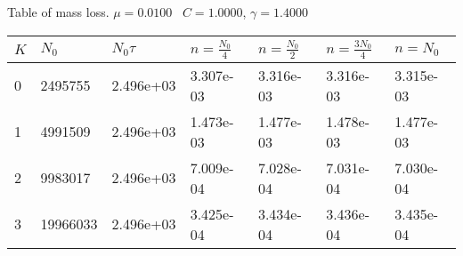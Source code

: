 \begin{center}
Table of mass loss. $\mu = 0.0100$ \, $C = 1.0000$, $\gamma = 1.4000$
  
\begin{tabular}{|p{0.8in}|p{0.8in}|p{0.8in}|p{0.8in}|p{0.8in}|p{0.8in}|p{0.8in}|} \hline
$K$ &$N_0$ &$N_0 \tau$ &$n = \frac{N_0}{4}$ &$n = \frac{N_0}{2}$ &$n = \frac{3N_0}{4}$ &$n = N_0$ \\ \hline 
0 &2495755 &2.496e+03 &3.307e-03 &3.316e-03 &3.316e-03 &3.315e-03 \\ \hline 
1 &4991509 &2.496e+03 &1.473e-03 &1.477e-03 &1.478e-03 &1.477e-03 \\ \hline 
2 &9983017 &2.496e+03 &7.009e-04 &7.028e-04 &7.031e-04 &7.030e-04 \\ \hline 
3 &19966033 &2.496e+03 &3.425e-04 &3.434e-04 &3.436e-04 &3.435e-04 \\ \hline 

\end{tabular}\\[20pt]
\end{center}
